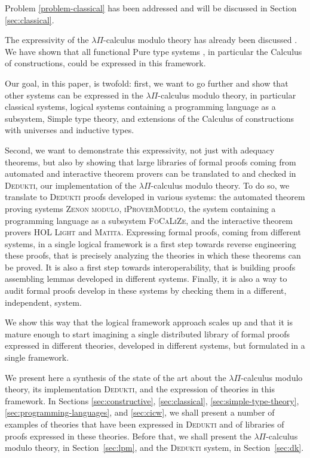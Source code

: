 \documentclass[english]{lipics}
\begin{document}
Problem \ref{problem-classical} has been addressed
\cite{Doweknotnot,HermantGilbert,Prawitz} and will be discussed in
Section \ref{sec:classical}.

The expressivity of the $\lambda \Pi$-calculus modulo theory has
already been discussed \cite{CousineauDowek}. We have shown
that all functional Pure type systems \cite{Barendregt1992}, in
particular the Calculus of constructions, could be expressed in this
framework.

Our goal, in this paper, is twofold: first, we want to go further and
show that other systems can be expressed in the $\lambda \Pi$-calculus
modulo theory, in particular classical systems, logical systems
containing a programming language as a subsystem,
Simple type theory, and extensions of the Calculus
of constructions with universes and inductive types.

Second, we want to demonstrate this expressivity, not just with
adequacy theorems, but also by showing that large libraries of formal
proofs coming from automated and interactive theorem provers can be
translated to and checked in \textsc{Dedukti}, our implementation of
the $\lambda \Pi$-calculus modulo theory. To do so, we translate
to \textsc{Dedukti} proofs developed in various systems: the automated
theorem proving systems \textsc{Zenon modulo}, \textsc{iProverModulo},
the system containing a programming language as a subsystem
\textsc{FoCaLiZe}, and the interactive theorem provers \textsc{HOL
  Light} and \textsc{Matita}.  Expressing formal proofs, coming from
different systems, in a single logical framework is a first step
towards reverse engineering these proofs, that is precisely analyzing
the theories in which these theorems can be proved. It is also a first
step towards interoperability, that is building proofs assembling
lemmas developed in different systems. Finally, it is also a
way to audit formal proofs develop in these systems by checking them
in a different, independent, system.

We show this way that the logical framework approach scales up and
that it is mature enough to start imagining a single distributed
library of formal proofs expressed in different theories, developed in
different systems, but formulated in a single framework.

We present here a synthesis of the state of the art about the
$\lambda \Pi$-calculus modulo theory, its implementation
\textsc{Dedukti}, and the expression of theories in this
framework. In Sections \ref{sec:constructive}, \ref{sec:classical},
\ref{sec:simple-type-theory}, \ref{sec:programming-languages}, and
\ref{sec:cicw}, we shall present a number of examples of theories that
have been expressed in \textsc{Dedukti} and of libraries of proofs
expressed in these theories. Before that, we shall present the
$\lambda \Pi$-calculus modulo theory, in Section~\ref{sec:lpm}, and
the \textsc{Dedukti} system, in Section~\ref{sec:dk}.
\end{document}

